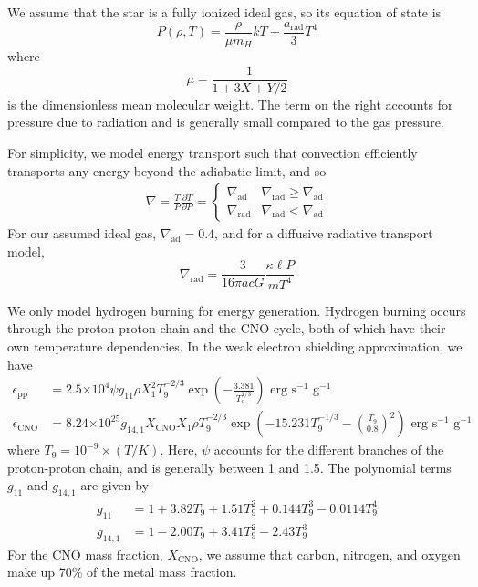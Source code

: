 \documentclass[onecolumn]{article}
\newcommand{\E}[1]{\ensuremath{\times 10^{#1}}}
\newcommand{\D}[2]{\ensuremath{\frac{\partial #1}{\partial #2}}}
\begin{document}
We assume that the star is a fully ionized ideal gas, so its equation of state is
\begin{equation}
  P(\rho, T) = \frac{\rho}{\mu m_H} kT + \frac{a_\text{rad}}{3} T^4
\end{equation}
where 
\begin{equation}
  \mu = \frac{1}{1 + 3X + Y/2}
\end{equation}
is the dimensionless mean molecular weight.  The term on the right accounts for pressure due to radiation and is generally small compared to the gas pressure.

For simplicity, we model energy transport such that convection efficiently transports any energy beyond the adiabatic limit, and so
\begin{align} \nabla = \frac{T}{P}\D{T}{P} = 
  \begin{cases}
    \nabla_\text{ad} & \nabla_\text{rad} \ge \nabla_\text{ad} \\
    \nabla_\text{rad} & \nabla_\text{rad} < \nabla_\text{ad}
  \end{cases}
\end{align}
For our assumed ideal gas, $\nabla_\text{ad} = 0.4$, and for a diffusive radiative transport model,
\begin{equation} 
  \nabla_\text{rad} = \frac{3}{16\pi a c G}\frac{\kappa \ell P}{m T^4} 
\end{equation}

We only model hydrogen burning for energy generation.  Hydrogen burning occurs through the proton-proton chain and the CNO cycle, both of which have their own temperature dependencies.  In the weak electron shielding approximation, we have
\begin{align}  
  \epsilon_\text{pp} &= 2.5\E{4} \psi g_\text{11} \rho X_1^2 T_9^{-2/3} \exp\left(-\frac{3.381}{T_9^{1/3}}\right) \text{ erg s}^{-1}\text{ g}^{-1} \\
  \epsilon_\text{CNO} &= 8.24\E{25} g_{14,1} X_\text{CNO} X_1 \rho T_9^{-2/3} \exp\left(-15.231 T_9^{-1/3} - \left(\frac{T_9}{0.8}\right)^2\right) \text{ erg s}^{-1}\text{ g}^{-1} \nonumber
\end{align}
where $T_9 = 10^{-9} \times (T / K)$. Here, $\psi$ accounts for the different branches of the proton-proton chain, and is generally between 1 and 1.5. The polynomial terms $g_{11}$ and $g_{14, 1}$ are given by
\begin{align}
  g_{11} &= 1 + 3.82 T_9 + 1.51 T_9^2 + 0.144 T_9^3 - 0.0114 T_9^4 \\
  g_{14, 1} &= 1 - 2.00 T_9 + 3.41 T_9^2 - 2.43 T_9^3 \nonumber
\end{align}
For the CNO mass fraction, $X_\text{CNO}$, we assume that carbon, nitrogen, and oxygen make up 70\% of the metal mass fraction.
\end{document}
